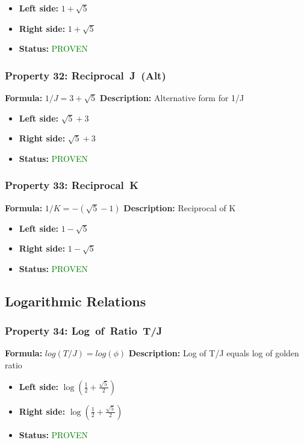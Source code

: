 \begin{itemize}
\item \textbf{Left side:} $1 + \sqrt{5}$
\item \textbf{Right side:} $1 + \sqrt{5}$
\item \textbf{Status:} \textcolor{green}{PROVEN}
\end{itemize}

\subsubsection*{Property 32: Reciprocal~J~(Alt)}
\textbf{Formula:} $1/J = 3 + \sqrt{5}$
\textbf{Description:} Alternative form for 1/J

\begin{itemize}
\item \textbf{Left side:} $\sqrt{5} + 3$
\item \textbf{Right side:} $\sqrt{5} + 3$
\item \textbf{Status:} \textcolor{green}{PROVEN}
\end{itemize}

\subsubsection*{Property 33: Reciprocal~K}
\textbf{Formula:} $1/K = -(\sqrt{5}-1)$
\textbf{Description:} Reciprocal of K

\begin{itemize}
\item \textbf{Left side:} $1 - \sqrt{5}$
\item \textbf{Right side:} $1 - \sqrt{5}$
\item \textbf{Status:} \textcolor{green}{PROVEN}
\end{itemize}


\subsection{Logarithmic Relations}

\subsubsection*{Property 34: Log~of~Ratio~T/J}
\textbf{Formula:} $log(T/J) = log(\phi)$
\textbf{Description:} Log of T/J equals log of golden ratio

\begin{itemize}
\item \textbf{Left side:} $\log{\left(\frac{1}{2} + \frac{\sqrt{5}}{2} \right)}$
\item \textbf{Right side:} $\log{\left(\frac{1}{2} + \frac{\sqrt{5}}{2} \right)}$
\item \textbf{Status:} \textcolor{green}{PROVEN}
\end{itemize}

